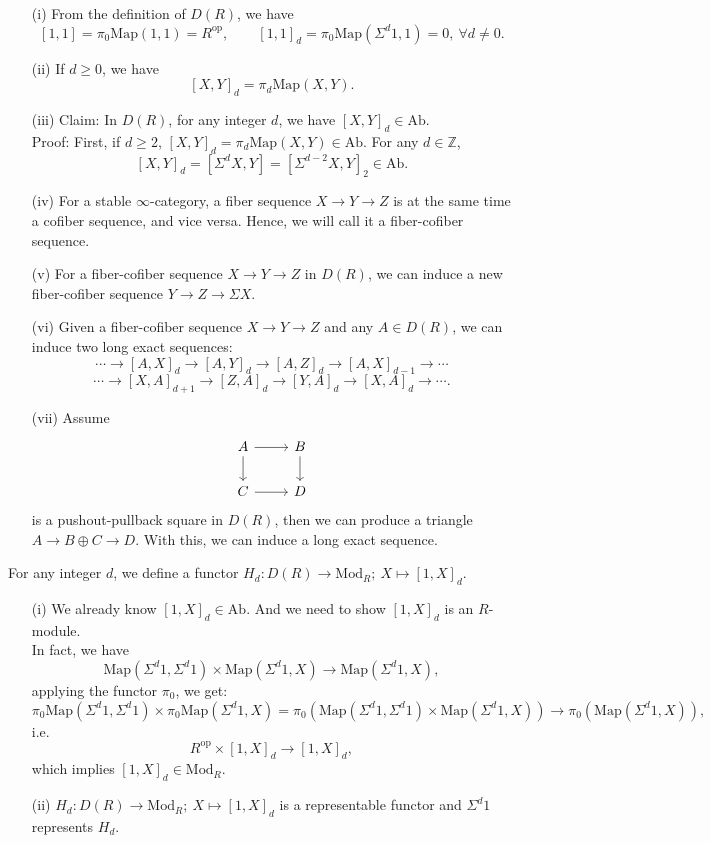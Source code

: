 \documentclass[UTF8,12,a4paper]{ctexart}
\theoremstyle{definition}
\begin{document}
\begin{itemize}
	\item [(i)] From the definition of $D(R)$, we have
	$$[1,1]=\pi_0\text{Map}(1,1)=R^{\text{op}},\quad\quad  [1,1]_d=\pi_0\text{Map}(\Sigma^d 1,1)=0,\ \forall d\neq 0.$$
	\item [(ii)] If $d\geq 0$, we have
	$$[X,Y]_d=\pi_d\text{Map}(X,Y).$$
	\item [(iii)] Claim: In $D(R)$, for any integer $d$, we have $[X,Y]_d\in\text{Ab}$.\\
	Proof: First, if $d\geq 2$, $[X,Y]_d=\pi_d\text{Map}(X,Y)\in\text{Ab}.$
	For any $d\in \mathbb{Z}$, 
	$$[X,Y]_d=[\Sigma^d X,Y]=[\Sigma^{d-2} X,Y]_2\in\text{Ab}.$$
	\item [(iv)] For a stable $\infty$-category, a fiber sequence $X\rightarrow Y\rightarrow Z$ is at the same time a cofiber sequence, and vice versa. Hence, we will call it a fiber-cofiber sequence.
	\item [(v)] For a fiber-cofiber sequence $X\rightarrow Y\rightarrow Z$ in $D(R)$, we can induce a new fiber-cofiber sequence $Y\rightarrow Z\rightarrow \Sigma X$.
	\item [(vi)] Given a fiber-cofiber sequence $X\rightarrow Y\rightarrow Z$ and any $A\in D(R)$, we can induce two long exact sequences:
	$$
	\cdots\longrightarrow[A,X]_d\longrightarrow[A,Y]_d\longrightarrow[A,Z]_d\longrightarrow[A,X]_{d-1}\longrightarrow\cdots
	$$
	$$
	\cdots\longrightarrow[X,A]_{d+1}\longrightarrow[Z,A]_d\longrightarrow[Y,A]_d\longrightarrow[X,A]_{d}\longrightarrow\cdots.
	$$
	\item [(vii)] Assume
	\begin{equation*}
	\begin{tikzcd}
	A \arrow[d] \arrow[r] & B \arrow[d] \\
	C \arrow[r]           & D          
	\end{tikzcd}
	\end{equation*}
	is a pushout-pullback square in $D(R)$, then we can produce a triangle $A\rightarrow B\oplus C\rightarrow D$. With this, we can induce a long exact sequence.
\end{itemize}

\dfn
For any integer $d$, we define a functor $H_d:D(R)\rightarrow\text{Mod}_R;\ X\mapsto [1,X]_d.$
\rem
\begin{itemize}
	\item [(i)] We already know $[1,X]_d\in\text{Ab}$. And we need to show $[1,X]_d$ is an $R$-module.\\
	In fact, we have
	$$
	\text{Map}(\Sigma^d 1,\Sigma^d 1)\times\text{Map}(\Sigma^d 1,X)\rightarrow\text{Map}(\Sigma^d 1,X),
	$$
	applying the functor $\pi_0$, we get:
	$$
		\pi_0\text{Map}(\Sigma^d 1,\Sigma^d 1)\times\pi_0\text{Map}(\Sigma^d 1,X)=\pi_0(\text{Map}(\Sigma^d 1,\Sigma^d 1)\times\text{Map}(\Sigma^d 1,X))\rightarrow\pi_0(\text{Map}(\Sigma^d 1,X)),
	$$
	i.e.
	$$R^{\text{op}}\times
	[1,X]_d\rightarrow[1,X]_d,$$
	which implies $[1,X]_d\in \text{Mod}_R.$
    \item[(ii)] $H_d:D(R)\rightarrow\text{Mod}_R;\ X\mapsto [1,X]_d$ is a representable functor and $\Sigma^d 1$ represents $H_d$.
\end{itemize}
\end{document}
